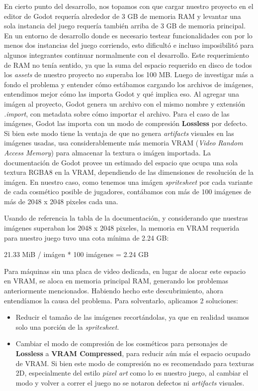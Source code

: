 En cierto punto del desarrollo, nos topamos con que cargar nuestro proyecto en el editor de Godot
requería alrededor de 3 GB de memoria RAM y levantar una sola instancia del juego requería también
arriba de 3 GB de memoria principal. En un entorno de desarrollo donde es necesario testear
funcionalidades con por lo menos dos instancias del juego corriendo, esto dificultó e incluso
imposibilitó para algunos integrantes continuar normalmente con el desarrollo. Este requerimiento
de RAM no tenía sentido, ya que la suma del espacio requerido en disco de todos los 
\textit{assets} de nuestro proyecto no superaba los 100 MB.
Luego de investigar más a fondo el problema y entender cómo estábamos cargando los archivos de imágenes,
entendimos mejor cómo las importa Godot y qué implica eso.
Al agregar una imágen al proyecto, Godot genera un archivo con el mismo nombre y extensión 
\textit{.import}, con metadata sobre cómo importar el archivo. Para el caso de las imágenes, 
Godot las importa con un modo de compresión \textbf{Lossless} por defecto. Si bien este modo
tiene la ventaja de que no genera \textit{artifacts} visuales en las imágenes usadas, usa 
considerablemente más memoria VRAM (\textit{Video Random Access Memory}) para almacenar la textura o
imágen importada. La documentación de Godot provee un estimado del espacio que ocupa una sola textura
RGBA8 en la VRAM, dependiendo de las dimensiones de resolución de la imágen. En nuestro caso, como
tenemos una imágen \textit{spritesheet} por cada variante de cada cosmético posible de jugadores,
contábamos con más de 100 imágenes de más de 2048 x 2048 pixeles cada una. 


Usando de referencia la tabla de la documentación, y considerando que nuestras imágenes superaban
los 2048 x 2048 pixeles, la memoria en VRAM requerida para nuestro juego tuvo una cota mínima de 
2.24 GB:

21.33 MiB / imágen * 100 imágenes = 2.24 GB

Para máquinas sin una placa de video dedicada, en lugar de alocar este espacio en VRAM, se aloca
en memoria principal RAM, generando los problemas anteriormente mencionados.
Habiendo hecho este descubrimiento, ahora entendíamos la causa del problema. Para solventarlo,
aplicamos 2 soluciones:

\begin{itemize}
    \item Reducir el tamaño de las imágenes recortándolas, ya que en realidad usamos solo
    una porción de la \textit{spritesheet}.
    \item Cambiar el modo de compresión de los cosméticos para personajes de \textbf{Lossless}
    a \textbf{VRAM Compressed}, para reducir aún más el espacio ocupado de VRAM. Si bien este
    modo de compresión no es recomendado para texturas 2D, especialmente del estilo
    \textit{pixel art} como lo es nuestro juego, al cambiar el modo y volver a correr el juego
    no se notaron defectos ni \textit{artifacts} visuales.
\end{itemize}
